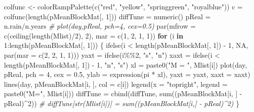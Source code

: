 \documentclass[
]{article}
\newenvironment{Shaded}{\begin{snugshade}}{\end{snugshade}}
\newcommand{\AttributeTok}[1]{\textcolor[rgb]{0.77,0.63,0.00}{#1}}
\newcommand{\CommentTok}[1]{\textcolor[rgb]{0.56,0.35,0.01}{\textit{#1}}}
\newcommand{\ConstantTok}[1]{\textcolor[rgb]{0.00,0.00,0.00}{#1}}
\newcommand{\ControlFlowTok}[1]{\textcolor[rgb]{0.13,0.29,0.53}{\textbf{#1}}}
\newcommand{\DecValTok}[1]{\textcolor[rgb]{0.00,0.00,0.81}{#1}}
\newcommand{\FloatTok}[1]{\textcolor[rgb]{0.00,0.00,0.81}{#1}}
\newcommand{\FunctionTok}[1]{\textcolor[rgb]{0.00,0.00,0.00}{#1}}
\newcommand{\NormalTok}[1]{#1}
\newcommand{\OtherTok}[1]{\textcolor[rgb]{0.56,0.35,0.01}{#1}}
\newcommand{\SpecialCharTok}[1]{\textcolor[rgb]{0.00,0.00,0.00}{#1}}
\newcommand{\StringTok}[1]{\textcolor[rgb]{0.31,0.60,0.02}{#1}}
\begin{document}
\begin{Shaded}
\begin{Highlighting}[]
\NormalTok{colfunc }\OtherTok{\textless{}{-}} \FunctionTok{colorRampPalette}\NormalTok{(}\FunctionTok{c}\NormalTok{(}\StringTok{"red"}\NormalTok{, }\StringTok{"yellow"}\NormalTok{, }\StringTok{"springgreen"}\NormalTok{, }\StringTok{"royalblue"}\NormalTok{))}
\NormalTok{c }\OtherTok{=} \FunctionTok{colfunc}\NormalTok{(}\FunctionTok{length}\NormalTok{(pMeanBlockMat[, }\DecValTok{1}\NormalTok{]))}
\NormalTok{diffTune }\OtherTok{=} \FunctionTok{numeric}\NormalTok{()}
\NormalTok{pReal }\OtherTok{=}\NormalTok{ n.rain}\SpecialCharTok{/}\NormalTok{n.years}
\CommentTok{\# plot(day,pReal, pch=4, cex=0.5)}
\FunctionTok{par}\NormalTok{(}\AttributeTok{mfrow =} \FunctionTok{c}\NormalTok{(}\FunctionTok{ceiling}\NormalTok{(}\FunctionTok{length}\NormalTok{(Mlist)}\SpecialCharTok{/}\DecValTok{2}\NormalTok{), }\DecValTok{2}\NormalTok{), }\AttributeTok{mar =} \FunctionTok{c}\NormalTok{(}\DecValTok{1}\NormalTok{, }\DecValTok{2}\NormalTok{, }\DecValTok{1}\NormalTok{, }\DecValTok{1}\NormalTok{))}
\ControlFlowTok{for}\NormalTok{ (i }\ControlFlowTok{in} \DecValTok{1}\SpecialCharTok{:}\FunctionTok{length}\NormalTok{(pMeanBlockMat[, }\DecValTok{1}\NormalTok{])) \{}
    \FunctionTok{ifelse}\NormalTok{(i }\SpecialCharTok{\textless{}} \FunctionTok{length}\NormalTok{(pMeanBlockMat[, }\DecValTok{1}\NormalTok{]) }\SpecialCharTok{{-}} \DecValTok{1}\NormalTok{, }\ConstantTok{NA}\NormalTok{, }\FunctionTok{par}\NormalTok{(}\AttributeTok{mar =} \FunctionTok{c}\NormalTok{(}\DecValTok{2}\NormalTok{, }\DecValTok{2}\NormalTok{, }\DecValTok{1}\NormalTok{, }\DecValTok{1}\NormalTok{)))}
\NormalTok{    yaxt }\OtherTok{=} \FunctionTok{ifelse}\NormalTok{(i}\SpecialCharTok{\%\%}\DecValTok{2}\NormalTok{, }\StringTok{"s"}\NormalTok{, }\StringTok{"n"}\NormalTok{)}
\NormalTok{    xaxt }\OtherTok{=} \FunctionTok{ifelse}\NormalTok{(i }\SpecialCharTok{\textless{}} \FunctionTok{length}\NormalTok{(pMeanBlockMat[, }\DecValTok{1}\NormalTok{]) }\SpecialCharTok{{-}} \DecValTok{1}\NormalTok{, }\StringTok{"n"}\NormalTok{, }\StringTok{"s"}\NormalTok{)}
\NormalTok{    xl }\OtherTok{=} \FunctionTok{paste0}\NormalTok{(}\StringTok{"M = "}\NormalTok{, Mlist[i])}
    \FunctionTok{plot}\NormalTok{(day, pReal, }\AttributeTok{pch =} \DecValTok{4}\NormalTok{, }\AttributeTok{cex =} \FloatTok{0.5}\NormalTok{, }\AttributeTok{ylab =} \FunctionTok{expression}\NormalTok{(pi }\SpecialCharTok{*}\NormalTok{ xl), }\AttributeTok{yaxt =}\NormalTok{ yaxt,}
        \AttributeTok{xaxt =}\NormalTok{ xaxt)}
    \FunctionTok{lines}\NormalTok{(day, pMeanBlockMat[i, ], }\AttributeTok{col =}\NormalTok{ c[i])}
    \FunctionTok{legend}\NormalTok{(}\AttributeTok{x =} \StringTok{"topright"}\NormalTok{, }\AttributeTok{legend =} \FunctionTok{paste0}\NormalTok{(}\StringTok{"M="}\NormalTok{, Mlist[i]))}
\NormalTok{    diffTune }\OtherTok{=} \FunctionTok{cbind}\NormalTok{(diffTune, }\FunctionTok{sum}\NormalTok{((pMeanBlockMat[i, ] }\SpecialCharTok{{-}}\NormalTok{ pReal)}\SpecialCharTok{\^{}}\DecValTok{2}\NormalTok{))}
    \CommentTok{\# diffTune[str(Mlist[i])] = sum((pMeanBlockMat[i,] {-} pReal)\^{}2)}
\NormalTok{\}}
\end{Highlighting}
\end{Shaded}
\end{document}
